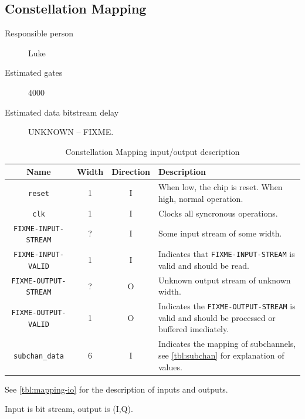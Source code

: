 \documentclass[dvips,10pt,twocolumn]{article}
\newcommand{\wire}{\texttt}
\begin{document}

\subsection{Constellation Mapping}
\label{sec:constellation}
\begin{description}
	\item[Responsible person] Luke
	\item[Estimated gates] 4000
	\item[Estimated data bitstream delay] UNKNOWN -- FIXME.
\end{description}

\begin{table} \begin{tabularx}{\linewidth}{c|c|c|X}
	\label{tbl:mapping-io}
	Name & Width & Direction & Description \\ \hline

	\wire{reset} & 1 & I & When low, the chip is reset. When high, normal
	operation. \\

	\wire{clk}   & 1 & I & Clocks all syncronous operations. \\

	\wire{FIXME-INPUT-STREAM} & ? & I & Some input stream of some width.
	\\

	\wire{FIXME-INPUT-VALID} & 1 & I & Indicates that
	\wire{FIXME-INPUT-STREAM} is valid and should be read. \\

	\wire{FIXME-OUTPUT-STREAM} & ? & O & Unknown output stream of unknown
	width. \\

	\wire{FIXME-OUTPUT-VALID} & 1 & O & Indicates the
	\wire{FIXME-OUTPUT-STREAM} is valid and should be processed or
	buffered imediately. \\

	\wire{subchan\_data} & 6 & I & Indicates the mapping of subchannels, see
	\autoref{tbl:subchan} for explanation of values. \\

\end{tabularx} \caption{Constellation Mapping input/output description}
\end{table}

See \autoref{tbl:mapping-io} for the description of inputs and outputs.

Input is bit stream, output is (I,Q).
\end{document}
